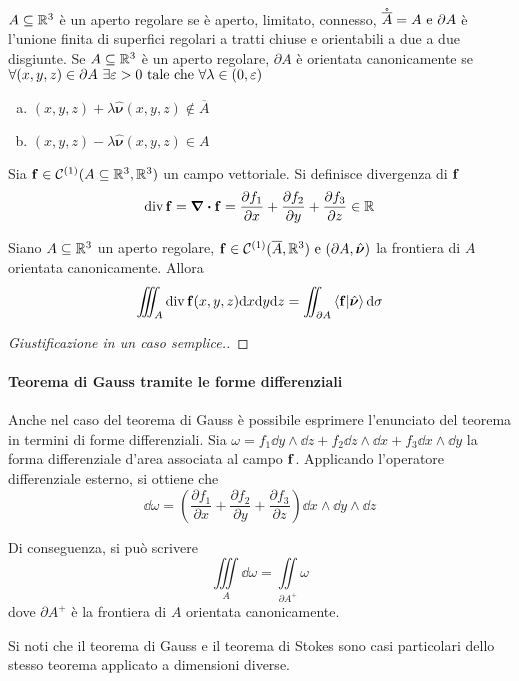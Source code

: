 \begin{definition}
	$A\subseteq \mathbb{R}^3$ è un aperto regolare se è aperto, limitato, connesso, $\mathring{\overline A}=A \text{ e } \partial A$ è l'unione finita di superfici regolari a tratti chiuse e orientabili a due a due disgiunte. Se $A \subseteq \mathbb{R}^3$ è un aperto regolare, $\partial A$ è orientata canonicamente se $\forall (x,y,z) \in \partial A \ \exists \varepsilon > 0 \text{ tale che } \forall \lambda \in (0,\varepsilon)$
	\begin{enumerate}[a.]
		\item $(x,y,z) + \lambda \hat{\bm \nu}(x,y,z) \notin \overline{A}$
		\item $(x,y,z) - \lambda \hat{\bm \nu}(x,y,z) \in A$
	\end{enumerate}
\end{definition}

\begin{definition}
	[Divergenza]
	Sia $\vb{f} \in \mathcal{C}^{(1)}(A\subseteq\mathbb{R}^3,\mathbb{R}^3)$ un campo vettoriale. Si definisce divergenza di $\vb{f}$
	$$
		\divop \vb{f}=\divergence \vb{f}=\frac{\partial f_1}{\partial x} + \frac{\partial f_2}{\partial y} + \frac{\partial f_3}{\partial z} \in \R
	$$
\end{definition}

\begin{theorem}
	Siano $A\subseteq \mathbb{R}^3$ un aperto regolare, $\vb{f} \in \mathcal{C}^{(1)}(\overline{A},\mathbb{R}^3) \text{ e } (\partial A, \hat{\bm \nu})$ la frontiera di $A$ orientata canonicamente. Allora
	$$
		\iiint_A \divop \vb{f}(x,y,z)\dd x \dd y \dd z = \iint_{\partial A}\ip{\vb{f}}{\hat{\bm \nu}}\dd \sigma
	$$
\end{theorem}

\begin{proof}
	[Giustificazione in un caso semplice.]
\end{proof}

\paragraph{Teorema di Gauss tramite le forme differenziali}

Anche nel caso del teorema di Gauss è possibile esprimere l'enunciato del teorema in termini di forme differenziali. Sia $\omega = f_1 \dd y \wedge \dd z + f_2 \dd z \wedge \dd x + f_3 \dd x \wedge \dd y$ la forma differenziale d'area associata al campo $\vb{f}$. Applicando l'operatore differenziale esterno, si ottiene che
$$
	\dd \omega = \left(\frac{\partial f_1}{\partial x} + \frac{\partial f_2}{\partial y} + \frac{\partial f_3}{\partial z}\right)\dd x \wedge \dd y \wedge \dd z
$$

Di conseguenza, si può scrivere
$$
	\iiint\limits_A \dd \omega = \iint\limits_{\partial A^+}\omega
$$
dove $\partial A^+$ è la frontiera di $A$ orientata canonicamente.

\begin{remark}
	Si noti che il teorema di Gauss e il teorema di Stokes sono casi particolari dello stesso teorema applicato a dimensioni diverse.
\end{remark}